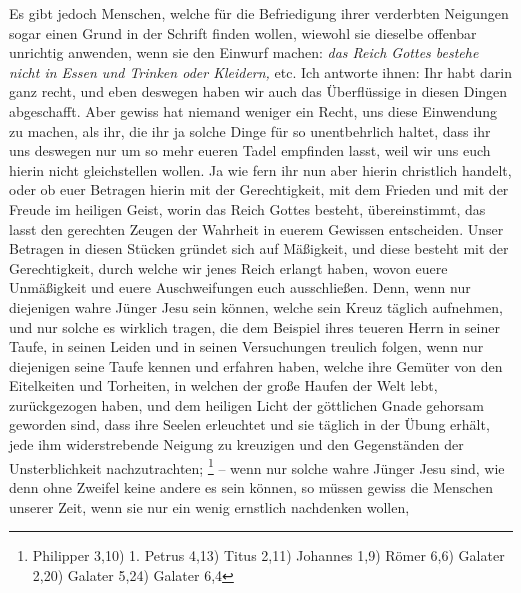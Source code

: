  Es gibt jedoch Menschen, welche für die Befriedigung ihrer verderbten Neigungen
sogar einen Grund in der Schrift finden wollen, wiewohl sie dieselbe offenbar
unrichtig anwenden, wenn sie den Einwurf machen:
\textit{das Reich Gottes bestehe nicht
in Essen und Trinken oder Kleidern,} etc. Ich antworte ihnen: Ihr habt darin ganz
recht, und eben deswegen haben wir auch das Überflüssige in diesen Dingen
abgeschafft. Aber gewiss hat niemand weniger ein Recht, uns diese Einwendung zu
machen, als ihr, die ihr ja solche Dinge für so unentbehrlich haltet, dass ihr
uns deswegen nur um so mehr eueren Tadel empfinden lasst, weil wir uns euch
hierin nicht gleichstellen wollen. Ja wie fern ihr nun aber hierin christlich
handelt, oder ob euer Betragen hierin mit der Gerechtigkeit, mit dem Frieden und
mit der Freude im heiligen Geist, worin das
Reich Gottes besteht,
übereinstimmt, das lasst den gerechten Zeugen der Wahrheit in euerem Gewissen
entscheiden. Unser Betragen in diesen Stücken gründet sich auf Mäßigkeit, und
diese besteht mit der Gerechtigkeit, durch welche wir jenes Reich erlangt
haben, wovon euere Unmäßigkeit und euere Auschweifungen euch ausschließen. Denn,
wenn nur diejenigen wahre Jünger Jesu sein können, welche sein Kreuz täglich
aufnehmen, und nur solche es wirklich tragen, die dem Beispiel ihres teueren
Herrn in seiner Taufe, in seinen Leiden und in seinen Versuchungen treulich
folgen, wenn nur diejenigen seine Taufe kennen und erfahren haben, welche ihre
Gemüter von den Eitelkeiten und Torheiten, in welchen der große Haufen der Welt
lebt, zurückgezogen haben, und dem heiligen Licht der göttlichen Gnade gehorsam
geworden sind, dass ihre Seelen erleuchtet und sie täglich in der Übung erhält,
jede ihm widerstrebende Neigung zu kreuzigen und den Gegenständen der
Unsterblichkeit nachzutrachten;
\footnote{Philipper 3,10)
1. Petrus 4,13)
Titus 2,11)
Johannes 1,9)
Römer 6,6)
Galater 2,20)
Galater 5,24)
Galater 6,4}
-- wenn nur solche wahre Jünger
Jesu sind, wie denn ohne Zweifel keine andere es sein können, so müssen gewiss
die Menschen unserer Zeit, wenn sie nur ein wenig ernstlich nachdenken wollen,
